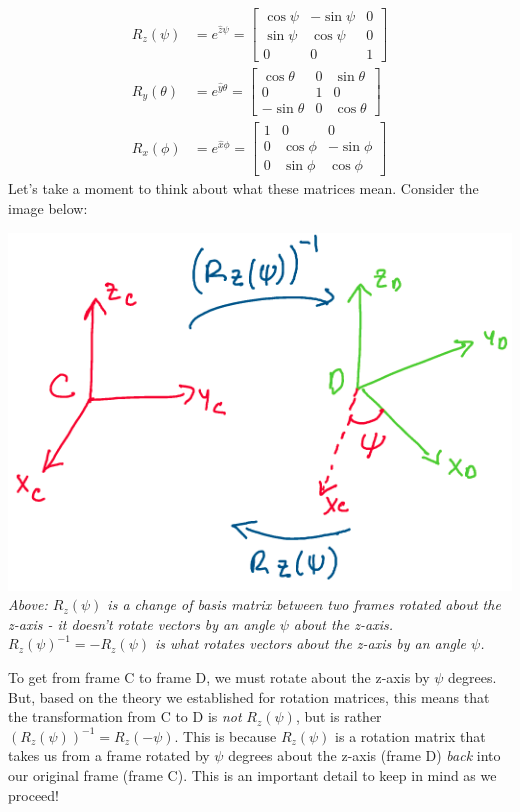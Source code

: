 \documentclass[oneside]{book}
\begin{document}
\begin{align}
    R_z(\psi) &= e^{\hat z\psi} = 
    \begin{bmatrix}
    \cos\psi & -\sin\psi & 0\\
    \sin\psi & \cos\psi & 0\\
    0 & 0 & 1
    \end{bmatrix}\\
    R_y(\theta) &= e^{\hat y\theta} =
    \begin{bmatrix}
    \cos\theta & 0 & \sin\theta\\
    0 & 1 & 0\\
    -\sin\theta & 0 & \cos\theta
    \end{bmatrix}\\
    R_x(\phi) &=e^{\hat x\phi} = 
    \begin{bmatrix}
    1 & 0 & 0\\
    0 & \cos\phi & -\sin\phi\\
    0 & \sin\phi & \cos\phi
    \end{bmatrix}
\end{align}
Let's take a moment to think about what these matrices mean. Consider the image below:
\begin{center}
    \includegraphics[scale=0.5]{images/cd_euler.png}\\
    \textit{Above: $R_z(\psi)$ is a change of basis matrix between two frames rotated about the z-axis - it doesn't rotate vectors by an angle $\psi$ about the z-axis. $R_z(\psi)^{-1} = -R_z(\psi)$ is what rotates vectors about the z-axis by an angle $\psi$.}
\end{center}
To get from frame C to frame D, we must rotate about the z-axis by $\psi$ degrees. But, based on the theory we established for rotation matrices, this means that the transformation from C to D is \textit{not} $R_z(\psi)$, but is rather $(R_z(\psi))^{-1} = R_z(-\psi)$. This is because $R_z(\psi)$ is a rotation matrix that takes us from a frame rotated by $\psi$ degrees about the z-axis (frame D) \textit{back} into our original frame (frame C). This is an important detail to keep in mind as we proceed!\\
\end{document}
